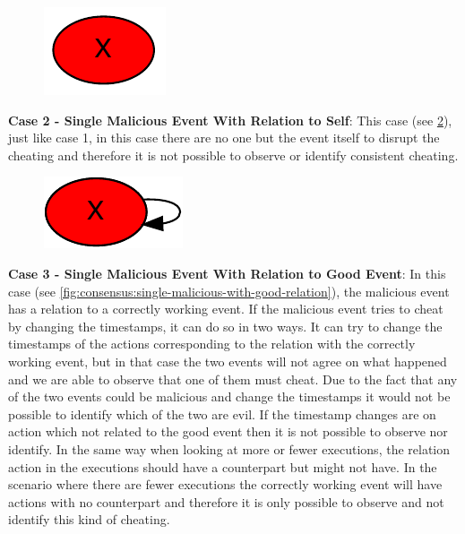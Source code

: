 	\begin{figure}[H]
		\centering
		\includegraphics[]{5validation/images/1.pdf}
		\caption{}
		\label{fig:consensus:single-malicious}
	\end{figure}
	
	
	\newpar \textbf{Case 2 - Single Malicious Event With Relation to Self}: This case (see \ref{fig:consensus:single-malicious-with-relation}), just like case 1, in this case there are no one but the event itself to disrupt the cheating and therefore it is not possible to observe or identify consistent cheating.
	
	\begin{figure}[H]
		\centering
		\includegraphics[]{5validation/images/5.pdf}
		\caption{}
		\label{fig:consensus:single-malicious-with-relation}
	\end{figure}
	
	\newpar \textbf{Case 3 - Single Malicious Event With Relation to Good Event}: In this case (see \ref{fig:consensus:single-malicious-with-good-relation}), the malicious event has a relation to a correctly working event. If the malicious event tries to cheat by changing the timestamps, it can do so in two ways. It can try to change the timestamps of the actions corresponding to the relation with the correctly working event, but in that case the two events will not agree on what happened and we are able to observe that one of them must cheat. Due to the fact that any of the two events could be malicious and change the timestamps it would not be possible to identify which of the two are evil.
	If the timestamp changes are on action which not related to the good event then it is not possible to observe nor identify. 
	In the same way when looking at more or fewer executions, the relation action in the executions should have a counterpart but might not have. In the scenario where there are fewer executions the correctly working event will have actions with no counterpart and therefore it is only possible to observe and not identify this kind of cheating. 
	
